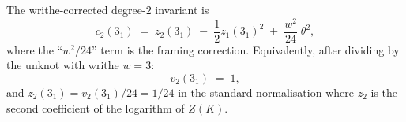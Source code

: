 \documentclass[11pt]{article}
\begin{document}
\begin{computation}
\label{comp:degree-2-trefoil}

The writhe-corrected degree-$2$ invariant is
\begin{equation}\label{eq:c2-trefoil}
  c_2(3_1)
  \;=\;
  z_2(3_1)
  \;-\;
  \frac{1}{2}z_1(3_1)^2
  \;+\;
  \frac{w^2}{24}\;\theta^2,
\end{equation}
where the ``$w^2/24$'' term is the framing correction.
Equivalently, after dividing by the unknot with writhe $w = 3$:
\begin{equation}\label{eq:z2-from-v2}
  v_2(3_1) \;=\; 1,
\end{equation}
and $z_2(3_1) = v_2(3_1)/24 = 1/24$ in the
standard normalisation where $z_2$ is the second coefficient
of the logarithm of $Z(K)$.
\end{computation}
\end{document}
